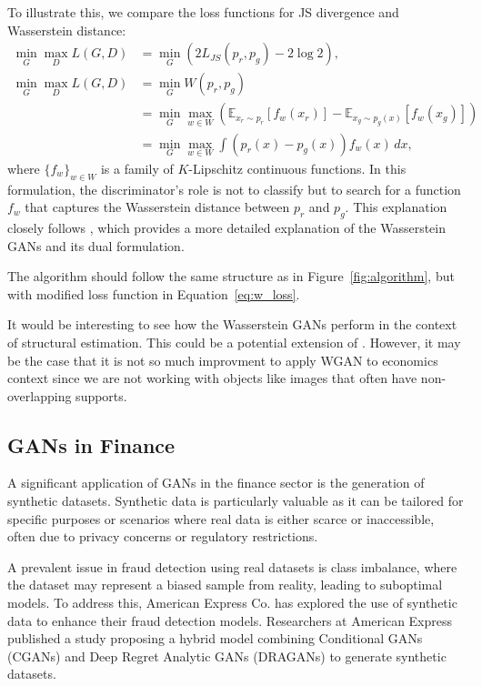 \documentclass[12pt]{article}
\begin{document}
To illustrate this, we compare the loss functions for JS divergence and
Wasserstein distance:
\begin{align}
    \min_G \max_D L(G, D) & = \min_G (2 L_{JS}(p_r, p_g) - 2 \log 2), \label{eq:js_loss}                                                                          \\
    \min_G \max_D L(G, D) & = \min_G W(p_r, p_g) \nonumber                                                                                                        \\
                          & = \min_G \max_{w \in W} \left( \mathbb{E}_{x_r \sim p_r}[f_w(x_r)] - \mathbb{E}_{x_g \sim p_g(x)}[f_w(x_g)] \right) \label{eq:w_loss} \\
                          & = \min_G \max_{w \in W} \int \left(p_r(x) - p_g(x)\right) f_w(x) \, dx, \nonumber
\end{align}
where \(\{f_w\}_{w \in W}\) is a family of \(K\)-Lipschitz continuous functions. In this formulation, the discriminator's role is not to classify but to search for a function \(f_w\) that captures the Wasserstein distance between \(p_r\) and \(p_g\). This explanation closely follows \citet{weng2017gan}, which provides a more detailed explanation of the Wasserstein GANs and its dual formulation.

The algorithm should follow the same structure as in
Figure~\ref{fig:algorithm}, but with modified loss function in
Equation~\ref{eq:w_loss}.

It would be interesting to see how the Wasserstein GANs perform in the context
of structural estimation. This could be a potential extension of
\citet{kaji2023adversarial}. However, it may be the case that it is not so much
improvment to apply WGAN to economics context since we are not working with
objects like images that often have non-overlapping supports.

\subsection{GANs in Finance}

A significant application of GANs in the finance sector is the generation of
synthetic datasets. Synthetic data is particularly valuable as it can be
tailored for specific purposes or scenarios where real data is either scarce or
inaccessible, often due to privacy concerns or regulatory restrictions.

A prevalent issue in fraud detection using real datasets is class imbalance,
where the dataset may represent a biased sample from reality, leading to
suboptimal models. To address this, American Express Co. has explored the use
of synthetic data to enhance their fraud detection models. Researchers at
American Express published a study \citep{efimovUsingGenerativeAdversarial2020}
proposing a hybrid model combining Conditional GANs (CGANs) and Deep Regret
Analytic GANs (DRAGANs) to generate synthetic datasets.
\end{document}
